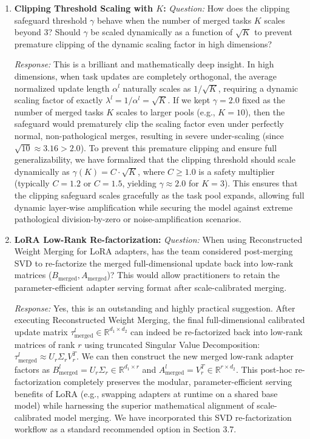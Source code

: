 \documentclass{article}
\theoremstyle{plain}
\theoremstyle{definition}
\theoremstyle{remark}
\begin{document}
\begin{enumerate}
    \item \textbf{Clipping Threshold Scaling with $K$:}
    \textit{Question:} How does the clipping safeguard threshold $\gamma$ behave when the number of merged tasks $K$ scales beyond 3? Should $\gamma$ be scaled dynamically as a function of $\sqrt{K}$ to prevent premature clipping of the dynamic scaling factor in high dimensions?
    
    \textit{Response:} This is a brilliant and mathematically deep insight. In high dimensions, when task updates are completely orthogonal, the average normalized update length $\alpha^l$ naturally scales as $1/\sqrt{K}$, requiring a dynamic scaling factor of exactly $\lambda^l = 1/\alpha^l = \sqrt{K}$. If we kept $\gamma = 2.0$ fixed as the number of merged tasks $K$ scales to larger pools (e.g., $K=10$), then the safeguard would prematurely clip the scaling factor even under perfectly normal, non-pathological merges, resulting in severe under-scaling (since $\sqrt{10} \approx 3.16 > 2.0$). To prevent this premature clipping and ensure full generalizability, we have formalized that the clipping threshold should scale dynamically as $\gamma(K) = C \cdot \sqrt{K}$, where $C \ge 1.0$ is a safety multiplier (typically $C = 1.2$ or $C = 1.5$, yielding $\gamma \approx 2.0$ for $K=3$). This ensures that the clipping safeguard scales gracefully as the task pool expands, allowing full dynamic layer-wise amplification while securing the model against extreme pathological division-by-zero or noise-amplification scenarios.
    
    \item \textbf{LoRA Low-Rank Re-factorization:}
    \textit{Question:} When using Reconstructed Weight Merging for LoRA adapters, has the team considered post-merging SVD to re-factorize the merged full-dimensional update back into low-rank matrices ($B_{\text{merged}}, A_{\text{merged}}$)? This would allow practitioners to retain the parameter-efficient adapter serving format after scale-calibrated merging.
    
    \textit{Response:} Yes, this is an outstanding and highly practical suggestion. After executing Reconstructed Weight Merging, the final full-dimensional calibrated update matrix $\tau_{\text{merged}}^l \in \mathbb{R}^{d_1 \times d_2}$ can indeed be re-factorized back into low-rank matrices of rank $r$ using truncated Singular Value Decomposition: $\tau_{\text{merged}}^l \approx U_r \Sigma_r V_r^T$. We can then construct the new merged low-rank adapter factors as $B_{\text{merged}}^l = U_r \Sigma_r \in \mathbb{R}^{d_1 \times r}$ and $A_{\text{merged}}^l = V_r^T \in \mathbb{R}^{r \times d_2}$. This post-hoc re-factorization completely preserves the modular, parameter-efficient serving benefits of LoRA (e.g., swapping adapters at runtime on a shared base model) while harnessing the superior mathematical alignment of scale-calibrated model merging. We have incorporated this SVD re-factorization workflow as a standard recommended option in Section 3.7.
    

\end{enumerate}
\end{document}
